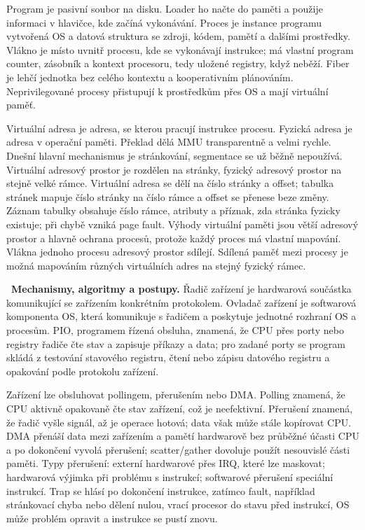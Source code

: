 \begin{odpoved}
Program je pasivní soubor na disku. Loader ho načte do paměti a použije informaci v
hlavičce, kde začíná vykonávání. Proces je instance programu vytvořená OS a datová
struktura se zdroji, kódem, pamětí a dalšími prostředky. Vlákno je místo uvnitř procesu,
kde se vykonávají instrukce; má vlastní program counter, zásobník a kontext procesoru,
tedy uložené registry, když neběží. Fiber je lehčí jednotka bez celého kontextu a
kooperativním plánováním. Neprivilegované procesy přistupují k prostředkům přes OS a
mají virtuální paměť.

Virtuální adresa je adresa, se kterou pracují instrukce procesu. Fyzická adresa je adresa
v operační paměti. Překlad dělá MMU transparentně a velmi rychle. Dnešní hlavní
mechanismus je stránkování, segmentace se už běžně nepoužívá. Virtuální adresový prostor
je rozdělen na stránky, fyzický adresový prostor na stejně velké rámce. Virtuální adresa
se dělí na číslo stránky a offset; tabulka stránek mapuje číslo stránky na číslo rámce a
offset se přenese beze změny. Záznam tabulky obsahuje číslo rámce, atributy a příznak,
zda stránka fyzicky existuje; při chybě vzniká page fault. Výhody virtuální paměti jsou
větší adresový prostor a hlavně ochrana procesů, protože každý proces má vlastní
mapování. Vlákna jednoho procesu adresový prostor sdílejí. Sdílená paměť mezi procesy je
možná mapováním různých virtuálních adres na stejný fyzický rámec.

\noindent{}\ \textbf{Mechanismy, algoritmy a postupy.}
Řadič zařízení je hardwarová součástka komunikující se zařízením konkrétním protokolem.
Ovladač zařízení je softwarová komponenta OS, která komunikuje s řadičem a poskytuje
jednotné rozhraní OS a procesům. PIO, programem řízená obsluha, znamená, že CPU přes
porty nebo registry řadiče čte stav a zapisuje příkazy a data; pro zadané porty se
program skládá z testování stavového registru, čtení nebo zápisu datového registru a
opakování podle protokolu zařízení.

Zařízení lze obsluhovat pollingem, přerušením nebo DMA. Polling znamená, že CPU aktivně
opakovaně čte stav zařízení, což je neefektivní. Přerušení znamená, že řadič vyšle
signál, až je operace hotová; data však může stále kopírovat CPU. DMA přenáší data mezi
zařízením a pamětí hardwarově bez průběžné účasti CPU a po dokončení vyvolá přerušení;
scatter/gather dovoluje použít nesouvislé části paměti. Typy přerušení: externí
hardwarové přes IRQ, které lze maskovat; hardwarová výjimka při problému s instrukcí;
softwarové přerušení speciální instrukcí. Trap se hlásí po dokončení instrukce, zatímco fault, například stránkovací chyba nebo dělení
nulou, vrací procesor do stavu před instrukcí, OS může problém opravit a
instrukce se pustí znovu.


\end{odpoved}

